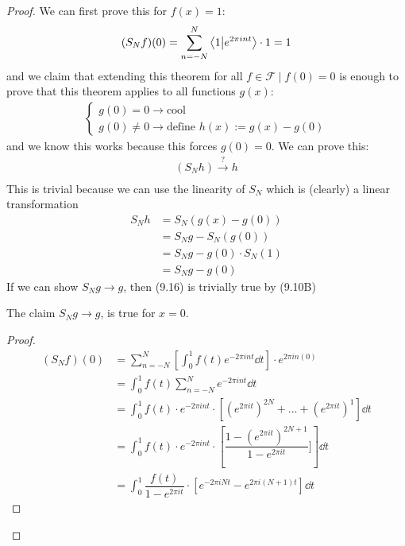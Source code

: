 \begin{proof}
    We can first prove this for $f(x) = 1$:
    \begin{align}
        (S_Nf)(0) = \sum_{n=-N}^N \braket{1}{e^{2\pi int}} \cdot 1 = 1
    \end{align}
    and we claim that extending this theorem for all $f \in \mathcal{F} \mid f(0) = 0$ is enough to prove that this theorem applies to all functions $g(x)$:
    \begin{align}
        \begin{cases}
            g(0) = 0 \to \text{cool}\\
            g(0) \ne 0 \to \text{define } h(x) := g(x) - g(0)
        \end{cases}
    \end{align}
    and we know this works because this forces $g(0) = 0$. We can prove this:
    \begin{align}
        (S_Nh) \stackrel{?}{\to} h\\
    \end{align}
    This is trivial because we can use the linearity of $S_N$ which is (clearly) a linear transformation
    \begin{align}
        S_Nh &= S_N(g(x) - g(0))\\
        &= S_Ng - S_N(g(0))\\
        &= S_Ng - g(0)\cdot S_N(1)\\
        &= S_Ng - g(0)
    \end{align}
    If we can show $S_Ng \to g$, then (9.16) is trivially true by (9.10B)
    \begin{lemma}
        The claim $S_Ng \to g$, is true for $x = 0$.
    \end{lemma}
    \begin{proof}
        \begin{align}
            (S_Nf)(0) &= \sum_{n=-N}^N \left[ \int_0^1 f(t) e^{-2\pi int} \dd{t} \right] \cdot e^{2\pi in(0)}\\
            &= \int_0^1 f(t) \sum_{n=-N}^N e^{-2\pi int} \dd{t}\\
            &= \int_0^1 f(t) \cdot e^{-2\pi int} \cdot \left[ \left(e^{2\pi it}\right)^{2N} + ... + \left(e^{2\pi it}\right)^{1} \right] \dd{t}\\
            &= \int_0^1 f(t) \cdot e^{-2\pi int} \cdot \left[ \dfrac{1 - (e^{2\pi it})^{2N+1}}{1-e^{2\pi it}}] \right] \dd{t}\\
            &= \int_0^1 \dfrac{f(t)}{1-e^{2\pi it}} \cdot \left[ e^{-2\pi iNt} - e^{2\pi i(N+1)t} \right] \dd{t}

\end{align}
\end{proof}
\end{proof}
